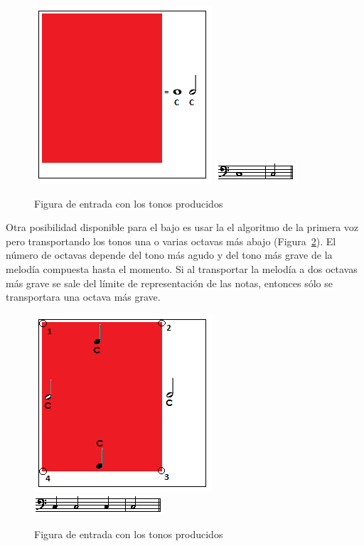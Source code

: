 		\begin{figure}[htbp]
		\centering
		\hspace*{0.0in}
		\includegraphics[scale=1]{graphics/simpletest2-F2F3.png}
		\includegraphics[scale=1]{graphics/simpletest2-BASSpartitura.png}
		\caption{Figura de entrada con los tonos producidos}
		\label{fig:Figura1Voz3}
		\end{figure}

Otra posibilidad disponible para el bajo es usar la el algoritmo de la primera voz pero transportando los tonos una o varias octavas más abajo (Figura~\ref{fig:Figura2Voz3}). El número de octavas depende del tono más agudo y del tono más grave de la melodía compuesta hasta el momento. Si al transportar la melodía a dos octavas más grave se sale del límite de representación de las notas, entonces sólo se transportara una octava más grave.

		\begin{figure}[htbp]
		\centering
		\hspace*{0.0in}
		\includegraphics[scale=1]{graphics/simpletest2-F2F3_2.png}
		\includegraphics[scale=1]{graphics/simpletest3_2-BASSpartitura.png}
		\caption{Figura de entrada con los tonos producidos}
		\label{fig:Figura2Voz3}
		\end{figure}

